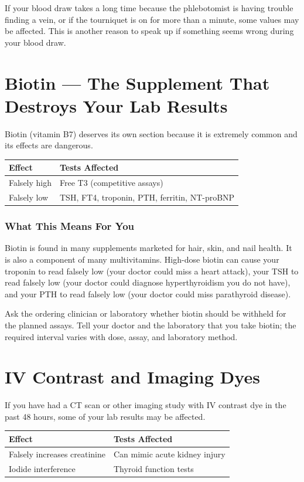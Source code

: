 If your blood draw takes a long time because the phlebotomist is having trouble finding a vein, or if the tourniquet is on for more than a minute, some values may be affected. This is another reason to speak up if something seems wrong during your blood draw.

\clearpage
\section{Biotin --- The Supplement That Destroys Your Lab Results}

Biotin (vitamin B7) deserves its own section because it is extremely common and its effects are dangerous.

\begin{longtable}{@{}ll@{}}
\toprule
\textbf{Effect} & \textbf{Tests Affected} \\
\midrule
Falsely high & Free T3 (competitive assays) \\
Falsely low & TSH, FT4, troponin, PTH, ferritin, NT-proBNP \\
\bottomrule
\end{longtable}

\subsubsection{What This Means For You}

Biotin is found in many supplements marketed for hair, skin, and nail health. It is also a component of many multivitamins. High-dose biotin can cause your troponin to read falsely low (your doctor could miss a heart attack), your TSH to read falsely low (your doctor could diagnose hyperthyroidism you do not have), and your PTH to read falsely low (your doctor could miss parathyroid disease).

Ask the ordering clinician or laboratory whether biotin should be withheld for the planned assays. Tell your doctor and the laboratory that you take biotin; the required interval varies with dose, assay, and laboratory method.

\clearpage
\section{IV Contrast and Imaging Dyes}

If you have had a CT scan or other imaging study with IV contrast dye in the past 48 hours, some of your lab results may be affected.

\begin{longtable}{@{}ll@{}}
\toprule
\textbf{Effect} & \textbf{Tests Affected} \\
\midrule
Falsely increases creatinine & Can mimic acute kidney injury \\
Iodide interference & Thyroid function tests \\
\bottomrule
\end{longtable}

